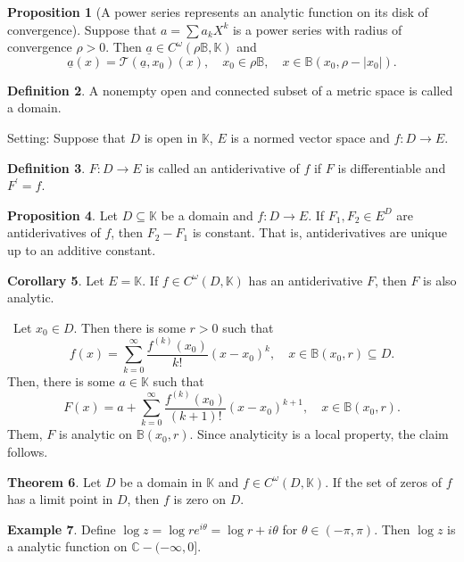 \documentclass[12pt,a4paper]{book}
\newenvironment{prooff}{{\noindent\it\textcolor{cyan!40!black}{Proof}:}\,}{\par}
\newcommand{\bb}[1]{\mathbb{#1}}
\theoremstyle{definition}
\newtheorem{defn}{Definition}[section]
\newtheorem{coro}[defn]{Corollary}
\newtheorem{theo}[defn]{Theorem}
\newtheorem{prop}[defn]{Proposition}
\newtheorem{exam}[defn]{Example}
\begin{document}
\begin{prop}[A power series represents an analytic function on its disk of convergence]
    Suppose that $a=\sum a_k X^k$ is a power series with radius of convergence $\rho>0$. Then $\underline{a} \in C^\omega(\rho \mathbb{B}, \mathbb{K})$ and
    $$
    \underline{a}(x)=\mathcal{T}\left(\underline{a}, x_0\right)(x), \quad x_0 \in \rho \mathbb{B}, \quad x \in \mathbb{B}\left(x_0, \rho-\left|x_0\right|\right) .
    $$
\end{prop}
\begin{defn}
    A nonempty open and connected subset of a metric space is called a domain.
\end{defn}
Setting: Suppose that $D$ is open in $\mathbb{K}$, 
$E$ is a normed vector space and $f: D \rightarrow E$.
\begin{defn}
$F: D \rightarrow E$ is called an antiderivative of $f$ if $F$ is differentiable and $F^{\prime}=f$.
\end{defn}
\begin{prop}
    Let $D \subseteq \mathbb{K}$ be a domain and $f: D \rightarrow E$. If $F_1, F_2 \in E^D$ are antiderivatives of $f$, then $F_2-F_1$ is constant. That is, antiderivatives are unique up to an additive constant.
\end{prop}
\begin{coro}
    Let $E=\mathbb{K}$. If $f \in C^\omega(D, \mathbb{K})$  has an antiderivative $F$, then $F$ is also analytic.
\end{coro}
\begin{prooff}
Let $x_0 \in D$. Then there is some $r>0$ such that
$$
f(x)=\sum_{k=0}^{\infty} \frac{f^{(k)}\left(x_0\right)}{k!}\left(x-x_0\right)^k, \quad x \in \mathbb{B}\left(x_0, r\right) \subseteq D .
$$
Then, there is some $a \in \mathbb{K}$ such that
$$
F(x)=a+\sum_{k=0}^{\infty} \frac{f^{(k)}\left(x_0\right)}{(k+1)!}\left(x-x_0\right)^{k+1}, \quad x \in \mathbb{B}\left(x_0, r\right) .
$$
Them, $F$ is analytic on $\mathbb{B}\left(x_0, r\right)$. Since analyticity is a local property, the claim follows.
\end{prooff}
\begin{theo}
    Let $D$ be a domain in $\mathbb{K}$ and $f \in C^\omega(D, \mathbb{K})$. If the set of zeros of $f$ has a limit point in $D$, then $f$ is zero on $D$.
\end{theo}
\begin{exam}
    Define $\log z=\log re^{i\theta}=\log r+i\theta$ for $\theta\in (-\pi,\pi)$. Then $\log z$ is a analytic function on 
    $\bb{C}-(-\infty,0]$. 
\end{exam}
\end{document}

